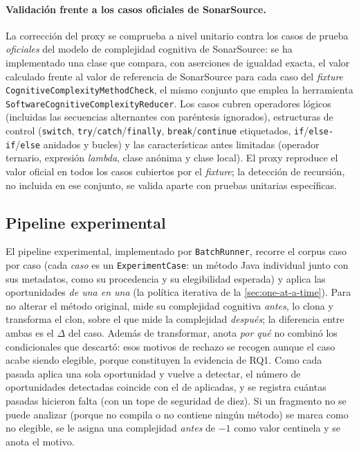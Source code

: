\paragraph{Validación frente a los casos oficiales de SonarSource.}
La
corrección del proxy se comprueba a nivel unitario contra los casos de
prueba \emph{oficiales} del modelo de complejidad cognitiva de SonarSource: se
ha implementado una clase que compara, con
aserciones de igualdad exacta, el valor calculado frente al valor de
referencia de SonarSource para cada caso del \emph{fixture}
\texttt{CognitiveComplexityMethodCheck}, el mismo conjunto que
emplea la herramienta \texttt{SoftwareCognitiveComplexityReducer}. Los
casos cubren operadores lógicos (incluidas las secuencias alternantes con
paréntesis ignorados), estructuras de control (\lstinline|switch|,
\lstinline|try|/\lstinline|catch|/\lstinline|finally|,
\lstinline|break|/\lstinline|continue| etiquetados,
\lstinline|if|/\lstinline|else-if|/\lstinline|else| anidados y bucles) y
las características antes limitadas (operador ternario, expresión \emph{lambda}, clase anónima
y clase local). El proxy reproduce el valor oficial en todos los casos cubiertos por el
\emph{fixture}; la detección de recursión, no incluida en ese conjunto, se valida
aparte con pruebas unitarias específicas.

\subsection{Pipeline experimental}
El pipeline experimental, implementado por \texttt{BatchRunner}, recorre el
corpus caso por caso (cada \emph{caso} es un \texttt{ExperimentCase}: un método
Java individual junto con sus metadatos, como su procedencia y su
elegibilidad esperada) y aplica las oportunidades \emph{de una en una} (la
política iterativa de la \autoref{sec:one-at-a-time}). Para no alterar el método original, mide su
complejidad cognitiva \emph{antes}, lo clona y transforma el clon, sobre el
que mide la complejidad \emph{después}; la diferencia entre ambas es el
$\Delta$ del caso. Además de transformar, anota \emph{por qué} no combinó
los condicionales que descartó: esos motivos de rechazo se recogen aunque
el caso acabe siendo elegible, porque constituyen la evidencia de RQ1. Como
cada pasada aplica una sola oportunidad y vuelve a detectar, el número de
oportunidades detectadas coincide con el de aplicadas, y se registra
cuántas pasadas hicieron falta (con un tope de seguridad de diez). Si un
fragmento no se puede analizar (porque no compila o no contiene ningún
método) se marca como no elegible, se le asigna una complejidad
\emph{antes} de $-1$ como valor centinela y se anota el motivo.

